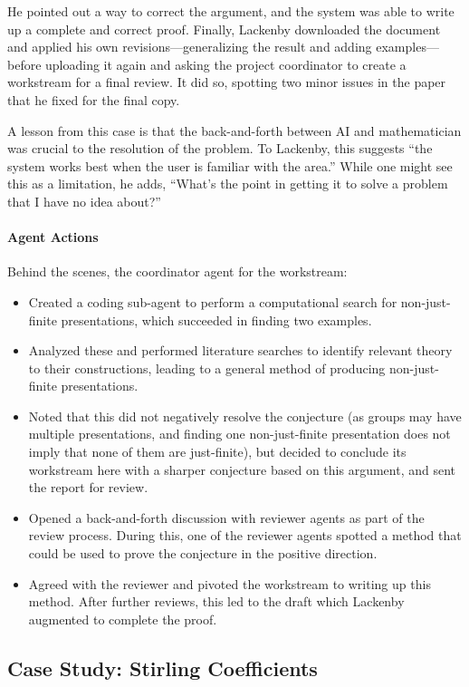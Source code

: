 \documentclass[11pt, a4paper, copyright, gdm]{google}
\begin{document}
He pointed out a way to correct the argument, and the system was able to write up a complete and correct proof.
Finally, Lackenby downloaded the document and applied his own revisions---generalizing the result and adding examples---before uploading it again and asking the project coordinator to create a workstream for a final review.
It did so, spotting two minor issues in the paper that he fixed for the final copy.

A lesson from this case is that the back-and-forth between AI and mathematician was crucial to the resolution of the problem.
To Lackenby, this suggests ``the system works best when the user is familiar with the area.''
While one might see this as a limitation, he adds, ``What's the point in getting it to solve a problem that I have no idea about?''

\paragraph{Agent Actions}

Behind the scenes, the coordinator agent for the workstream:
\begin{itemize}
     \item Created a coding sub-agent to perform a computational search for non-just-finite presentations, which succeeded in finding two examples.
     \item Analyzed these and performed literature searches to identify relevant theory to their constructions, leading to a general method of producing non-just-finite presentations.
     \item Noted that this did not negatively resolve the conjecture (as groups may have multiple presentations, and finding one non-just-finite presentation does not imply that none of them are just-finite), but decided to conclude its workstream here with a sharper conjecture based on this argument, and sent the report for review.
     \item Opened a back-and-forth discussion with reviewer agents as part of the review process.
     During this, one of the reviewer agents spotted a method that could be used to prove the conjecture in the positive direction.
     \item Agreed with the reviewer and pivoted the workstream to writing up this method.
     After further reviews, this led to the draft which Lackenby augmented to complete the proof.
\end{itemize}


\subsection{Case Study: Stirling Coefficients}
\end{document}
